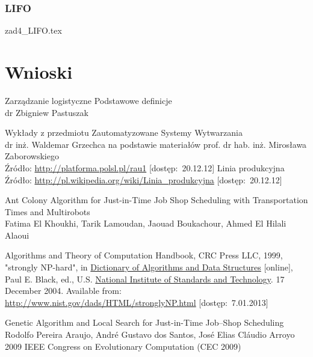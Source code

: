 \documentclass[twoside]{kInzynierka}
\begin{document}
\subsubsection  {LIFO}
 {zad4_LIFO.tex}

\section        {Wnioski}

   
\begin{thebibliography}{99}


Zarządzanie logistyczne Podstawowe definicje \\
dr Zbigniew Pastuszak

Wykłady z przedmiotu Zautomatyzowane Systemy Wytwarzania\\
dr inż. Waldemar Grzechca na podstawie materiałów prof. dr hab. inż. Mirosława Zaborowskiego \\
Źródło: \url{http://platforma.polsl.pl/rau1} [dostęp:~20.12.12]
Linia produkcyjna \\
Źródło: \url{http://pl.wikipedia.org/wiki/Linia_produkcyjna} [dostęp:~20.12.12]

Ant Colony Algorithm for Just-in-Time Job Shop Scheduling with Transportation Times and Multirobots \\
Fatima El Khoukhi, Tarik Lamoudan, Jaouad Boukachour, Ahmed El Hilali Alaoui

Algorithms and Theory of Computation Handbook, CRC Press LLC, 1999, "strongly NP-hard", in \href{http://xlinux.nist.gov/dads/}{Dictionary of Algorithms and Data Structures} [online], Paul E. Black, ed., U.S. \href{http://www.nist.gov/}{National Institute of Standards and Technology}. 17 December 2004. Available from: \url{http://www.nist.gov/dads/HTML/stronglyNP.html} [dostęp:~7.01.2013]

Genetic Algorithm and Local Search for Just-in-Time Job–Shop Scheduling \\
Rodolfo Pereira Araujo, André Gustavo dos Santos, José Elias Cláudio Arroyo \\
2009 IEEE Congress on Evolutionary Computation (CEC 2009)




\end{thebibliography}
\end{document}
